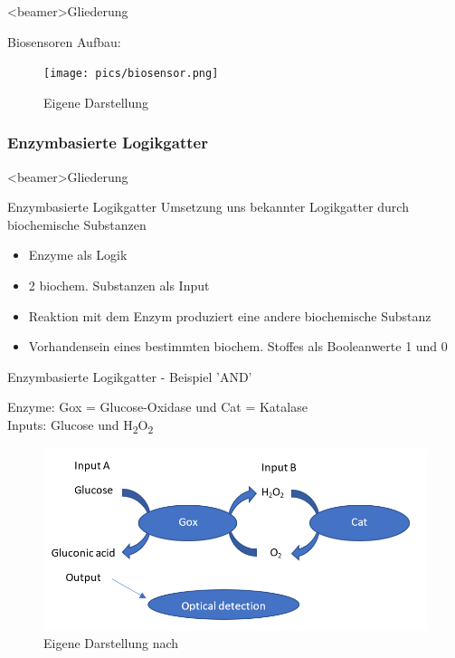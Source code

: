 \documentclass{beamer}
\begin{document}
 	\begin{frame}<beamer>{Gliederung}
 	\end{frame}
 	
    \begin{frame}{Biosensoren}
       Aufbau: 
        \begin{figure}[H] \centering \texttt{[image: pics/biosensor.png]} \caption{Eigene Darstellung} \label{img:and} 	
       \end{figure}
    \end{frame}



	\subsubsection{Enzymbasierte Logikgatter}
	
	\begin{frame}<beamer>{Gliederung}
	\end{frame}

    \begin{frame}{Enzymbasierte Logikgatter}
    Umsetzung uns bekannter Logikgatter durch biochemische Substanzen
    
    	\begin{itemize}	
    		\item Enzyme als Logik
    		\item 2 biochem. Substanzen als Input
    		\item Reaktion mit dem Enzym produziert eine andere biochemische Substanz
    		\item Vorhandensein eines bestimmten biochem. Stoffes als Booleanwerte 1 und 0
    	\end{itemize}     
    \end{frame}
        
    \begin{frame}{Enzymbasierte Logikgatter - Beispiel 'AND'}
    
    Enzyme: Gox = Glucose-Oxidase und Cat = Katalase\\
    Inputs: Glucose und H\textsubscript{2}O\textsubscript{2}
    
     \begin{figure}[H] \centering \includegraphics[scale= 0.33]{pics/ANDneu.png} \caption{Eigene Darstellung nach \cite{hallo4} } \label{img:and} 	
   	 \end{figure}
  
    \end{frame}
\end{document}
